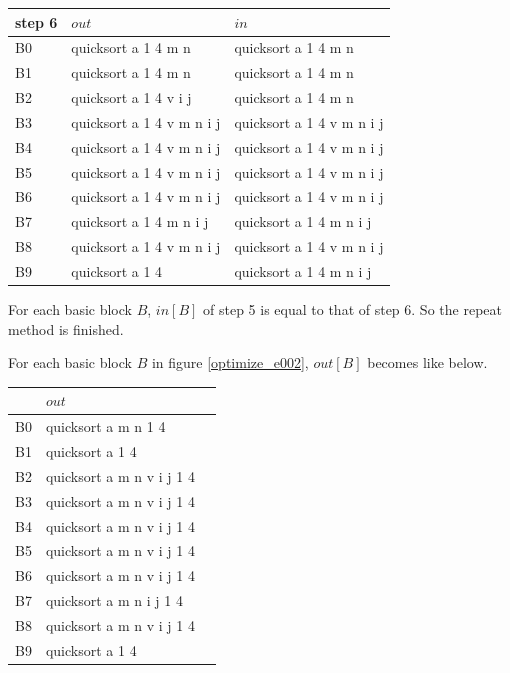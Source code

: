 \begin{tabular}{|l|l|l|} \hline
step 6  & $out$             & $in$      \\ \hline
B0 & quicksort a 1 4 m n       & quicksort a 1 4 m n        \\ \hline
B1 & quicksort a 1 4 m n       & quicksort a 1 4 m n        \\ \hline
B2 & quicksort a 1 4 v i j     & quicksort a 1 4 m n        \\ \hline
B3 & quicksort a 1 4 v m n i j & quicksort a 1 4 v m n i j  \\ \hline
B4 & quicksort a 1 4 v m n i j & quicksort a 1 4 v m n i j  \\ \hline
B5 & quicksort a 1 4 v m n i j & quicksort a 1 4 v m n i j  \\ \hline
B6 & quicksort a 1 4 v m n i j & quicksort a 1 4 v m n i j  \\ \hline
B7 & quicksort a 1 4 m n i j   & quicksort a 1 4 m n i j  \\ \hline
B8 & quicksort a 1 4 v m n i j & quicksort a 1 4 v m n i j  \\ \hline
B9 & quicksort a 1 4           & quicksort a 1 4 m n i j \\ \hline
\end{tabular}

\vspace{0.5cm}
For each basic block $B$, $in[B]$ of step 5 is equal to that of step 6.
So the repeat method is finished.

For each basic block $B$ in figure \ref{optimize_e002},
$out[B]$ becomes like below.

\vspace{0.5cm}

\begin{tabular}{|l|l|l|} \hline
   & $out$                            \\ \hline
B0 & quicksort a m n  1 4             \\  \hline
B1 & quicksort a 1 4                  \\ \hline
B2 & quicksort a m n  v i j 1 4       \\ \hline
B3 & quicksort a m n  v i j 1 4       \\ \hline
B4 & quicksort a m n  v i j 1 4       \\ \hline
B5 & quicksort a m n  v i j 1 4       \\ \hline
B6 & quicksort a m n  v i j 1 4       \\ \hline
B7 & quicksort a m n    i j 1 4       \\ \hline
B8 & quicksort a m n  v i j 1 4       \\ \hline
B9 & quicksort a 1 4              \\ \hline
\end{tabular}


